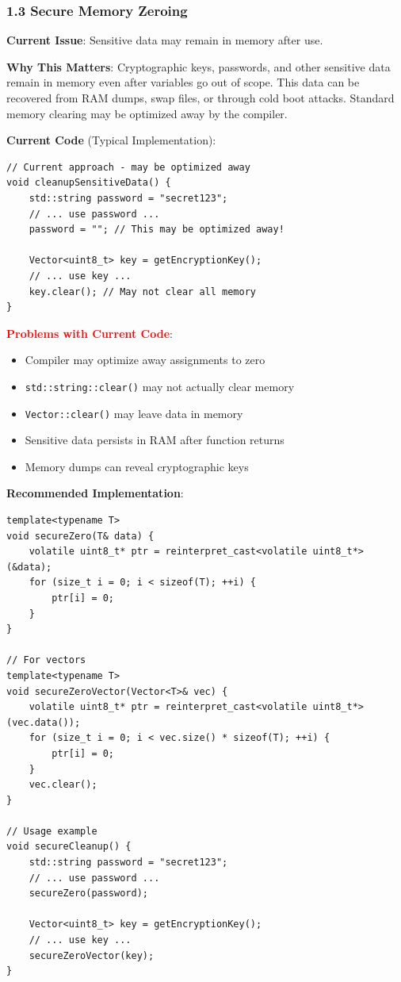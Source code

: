 \documentclass[11pt,a4paper]{article}
\begin{document}
\subsubsection{1.3 Secure Memory Zeroing}

\textbf{Current Issue}: Sensitive data may remain in memory after use.

\textbf{Why This Matters}: Cryptographic keys, passwords, and other sensitive data remain in memory even after variables go out of scope. This data can be recovered from RAM dumps, swap files, or through cold boot attacks. Standard memory clearing may be optimized away by the compiler.

\textbf{Current Code} (Typical Implementation):
\begin{lstlisting}
// Current approach - may be optimized away
void cleanupSensitiveData() {
    std::string password = "secret123";
    // ... use password ...
    password = ""; // This may be optimized away!
    
    Vector<uint8_t> key = getEncryptionKey();
    // ... use key ...
    key.clear(); // May not clear all memory
}
\end{lstlisting}

\textcolor{red}{\textbf{Problems with Current Code}}:
\begin{itemize}
    \item Compiler may optimize away assignments to zero
    \item \texttt{std::string::clear()} may not actually clear memory
    \item \texttt{Vector::clear()} may leave data in memory
    \item Sensitive data persists in RAM after function returns
    \item Memory dumps can reveal cryptographic keys
\end{itemize}

\textbf{Recommended Implementation}:
\begin{lstlisting}
template<typename T>
void secureZero(T& data) {
    volatile uint8_t* ptr = reinterpret_cast<volatile uint8_t*>(&data);
    for (size_t i = 0; i < sizeof(T); ++i) {
        ptr[i] = 0;
    }
}

// For vectors
template<typename T>
void secureZeroVector(Vector<T>& vec) {
    volatile uint8_t* ptr = reinterpret_cast<volatile uint8_t*>(vec.data());
    for (size_t i = 0; i < vec.size() * sizeof(T); ++i) {
        ptr[i] = 0;
    }
    vec.clear();
}

// Usage example
void secureCleanup() {
    std::string password = "secret123";
    // ... use password ...
    secureZero(password);
    
    Vector<uint8_t> key = getEncryptionKey();
    // ... use key ...
    secureZeroVector(key);
}
\end{lstlisting}
\end{document}

